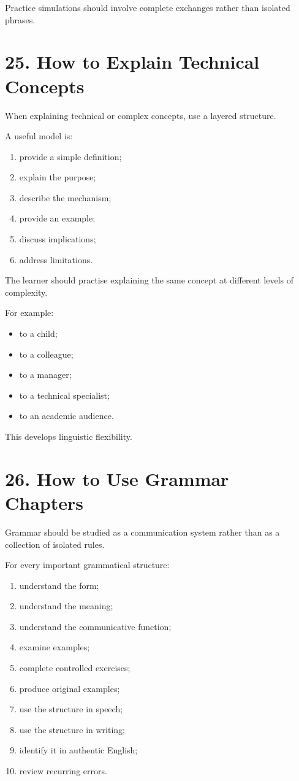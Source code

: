 Practice simulations should involve complete exchanges rather than isolated phrases.

\section*{25. How to Explain Technical Concepts}

When explaining technical or complex concepts, use a layered structure.

A useful model is:

\begin{enumerate}
    \item provide a simple definition;
    \item explain the purpose;
    \item describe the mechanism;
    \item provide an example;
    \item discuss implications;
    \item address limitations.
\end{enumerate}

The learner should practise explaining the same concept at different levels of complexity.

For example:

\begin{itemize}
    \item to a child;
    \item to a colleague;
    \item to a manager;
    \item to a technical specialist;
    \item to an academic audience.
\end{itemize}

This develops linguistic flexibility.

\section*{26. How to Use Grammar Chapters}

Grammar should be studied as a communication system rather than as a collection of isolated rules.

For every important grammatical structure:

\begin{enumerate}
    \item understand the form;
    \item understand the meaning;
    \item understand the communicative function;
    \item examine examples;
    \item complete controlled exercises;
    \item produce original examples;
    \item use the structure in speech;
    \item use the structure in writing;
    \item identify it in authentic English;
    \item review recurring errors.
\end{enumerate}

